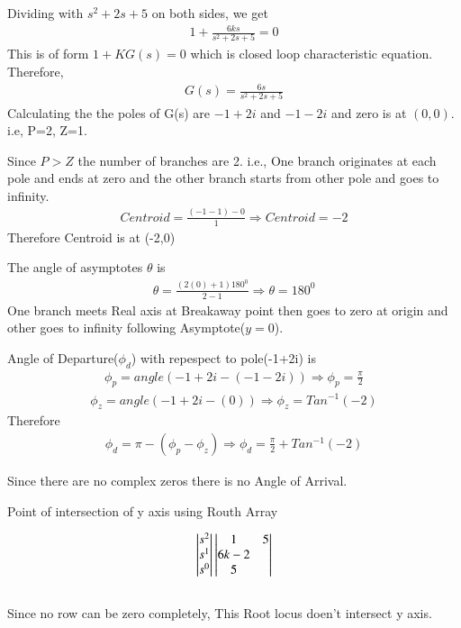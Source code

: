 \begin{enumerate}[label=\thesection.\arabic*.,ref=\thesection.\theenumi]
Dividing with $s^2 + 2s + 5$ on both sides, we get
\begin{align}
    1+\frac{6 k s}{s^{2}+2 s+5}=0    
\end{align}
This is of form $1+KG(s)=0$ which is closed loop characteristic equation. Therefore,
\begin{align}
G(s) = \frac{6 s}{s^{2}+2 s+5}
\end{align}
Calculating the the poles of G(s) are $-1+2i$ and $-1-2i$ and zero is at $(0,0)$. i.e, P=2, Z=1.

Since $P>Z$ the number of branches are 2. i.e., One branch originates at each pole and ends at zero and the other branch starts from other pole and goes to infinity.
\begin{align}
Centroid = \frac{(-1-1)-0}{1} \Rightarrow Centroid= -2
\end{align}
 Therefore Centroid is at (-2,0)

The angle of asymptotes $\theta$ is
\begin{align}
\theta=\frac{(2(0)+1) 180^{0}}{2-1} \Rightarrow \theta = 180^{0}
\end{align}
One branch meets Real axis at Breakaway point then goes to zero at origin and other goes to infinity following Asymptote($y=0$).

Angle of Departure($\phi_{d}$) with repespect to pole(-1+2i) is
\begin{align}
\phi_{p} = angle(-1+2i-(-1-2i))\Rightarrow \phi_{p}= \frac{\pi}{2}
\end{align}
\begin{align}
\phi_{z} = angle(-1+2i-(0))\Rightarrow \phi_{z}= Tan^{-1}(-2) 
\end{align}
Therefore
\begin{align}
\phi_{d} = \pi - (\phi_{p} - \phi_{z}) \Rightarrow \phi_{d} = \frac{\pi}{2} + Tan^{-1}(-2)
\end{align}

Since there are no complex zeros there is no Angle of Arrival.

Point of intersection of y axis using Routh Array

 \begin{align}
\begin{vmatrix}s^2\\s^1\\s^0\end{vmatrix}
\begin{vmatrix}1 & 5 \\ 6k-2 \\ 5\end{vmatrix}
\end{align}\\
Since no row can be zero completely, This Root locus doen't intersect y axis.





\end{enumerate}
